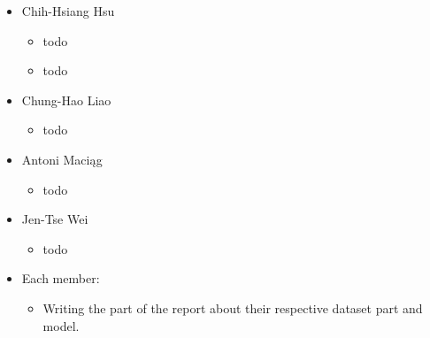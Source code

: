 \documentclass[twocolumn]{article}
\begin{document}
\begin{itemize}
	\item Chih-Hsiang Hsu
	\begin{itemize}
		\item todo
		\item todo
	\end{itemize}
	
	\item Chung-Hao Liao
	\begin{itemize}
		\item todo
	\end{itemize}
	
	\item Antoni Maciąg
	\begin{itemize}
		\item todo
	\end{itemize}
	
	\item Jen-Tse Wei
	\begin{itemize}
		\item todo
	\end{itemize}
	
	\item Each member:
	\begin{itemize}
		\item Writing the part of the report about their respective dataset part and model.
	\end{itemize}
\end{itemize}
\end{document}

